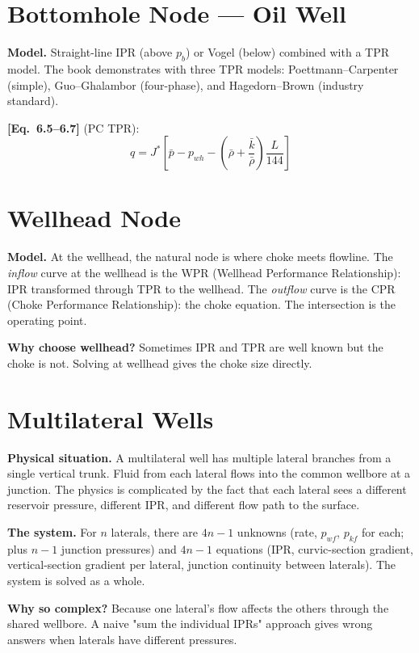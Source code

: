 \documentclass[11pt,a4paper,openany]{book}
\newcommand{\eqrefbook}[1]{\textcolor{blue!60!black}{\textbf{[Eq.~#1]}}}
\begin{document}
\section{Bottomhole Node — Oil Well}

\begin{theory}
\textbf{Model.} Straight-line IPR (above $p_b$) or Vogel (below) combined
with a TPR model. The book demonstrates with three TPR models:
Poettmann--Carpenter (simple), Guo--Ghalambor (four-phase), and
Hagedorn--Brown (industry standard).
\end{theory}

\eqrefbook{6.5--6.7} (PC TPR):
\begin{equation}
  q = J^*\left[\bar{p} - p_{wh} - \left(\bar{\rho} + \frac{\bar{k}}{\bar{\rho}}
  \right)\frac{L}{144}\right]
\end{equation}

\section{Wellhead Node}

\begin{theory}
\textbf{Model.} At the wellhead, the natural node is where choke meets
flowline. The \emph{inflow} curve at the wellhead is the WPR (Wellhead
Performance Relationship): IPR transformed through TPR to the
wellhead. The \emph{outflow} curve is the CPR (Choke Performance
Relationship): the choke equation. The intersection is the operating
point.

\textbf{Why choose wellhead?} Sometimes IPR and TPR are well known but
the choke is not. Solving at wellhead gives the choke size directly.
\end{theory}

\section{Multilateral Wells}

\begin{theory}
\textbf{Physical situation.} A multilateral well has multiple lateral
branches from a single vertical trunk. Fluid from each lateral flows
into the common wellbore at a junction. The physics is complicated by
the fact that each lateral sees a different reservoir pressure,
different IPR, and different flow path to the surface.

\textbf{The system.} For $n$ laterals, there are $4n - 1$ unknowns
(rate, $p_{wf}$, $p_{kf}$ for each; plus $n-1$ junction pressures)
and $4n - 1$ equations (IPR, curvic-section gradient, vertical-section
gradient per lateral, junction continuity between laterals). The system
is solved as a whole.

\textbf{Why so complex?} Because one lateral's flow affects the others
through the shared wellbore. A naive "sum the individual IPRs" approach
gives wrong answers when laterals have different pressures.
\end{theory}
\end{document}
